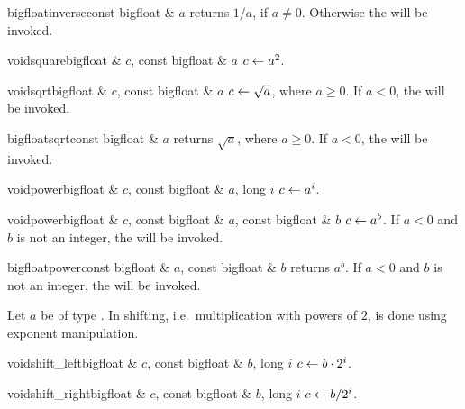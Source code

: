 \begin{fcode}{bigfloat}{inverse}{const bigfloat & $a$}
  returns $1 / a$, if $a \neq 0$.  Otherwise the \LEH will be invoked.
\end{fcode}

\begin{fcode}{void}{square}{bigfloat & $c$, const bigfloat & $a$}
  $c \leftarrow a^2$.
\end{fcode}

\begin{fcode}{void}{sqrt}{bigfloat & $c$, const bigfloat & $a$}
  $c \leftarrow \sqrt{a}$, where $a \geq 0$.  If $a < 0$, the \LEH will be invoked.
\end{fcode}

\begin{fcode}{bigfloat}{sqrt}{const bigfloat & $a$}
  returns $\sqrt{a}$, where $a \geq 0$.  If $a < 0$, the \LEH will be invoked.
\end{fcode}

\begin{fcode}{void}{power}{bigfloat & $c$, const bigfloat & $a$, long $i$}
  $c \leftarrow a^i$.
\end{fcode}

\begin{fcode}{void}{power}{bigfloat & $c$, const bigfloat & $a$, const bigfloat & $b$}
  $c \leftarrow a^b$. If $a < 0$ and $b$ is not an integer, the \LEH will be invoked.
\end{fcode}

\begin{fcode}{bigfloat}{power}{const bigfloat & $a$, const bigfloat & $b$}
  returns $a^b$. If $a < 0$ and $b$ is not an integer, the \LEH will be invoked.
\end{fcode}



\SHFT

Let $a$ be of type .  In  shifting, i.e.~multiplication with
powers of $2$, is done using exponent manipulation.

\begin{fcode}{void}{shift_left}{bigfloat & $c$, const bigfloat & $b$, long $i$}
  $c \leftarrow b \cdot 2^i$.
\end{fcode}

\begin{fcode}{void}{shift_right}{bigfloat & $c$, const bigfloat & $b$, long $i$}
  $c \leftarrow b / 2^i$.
\end{fcode}


